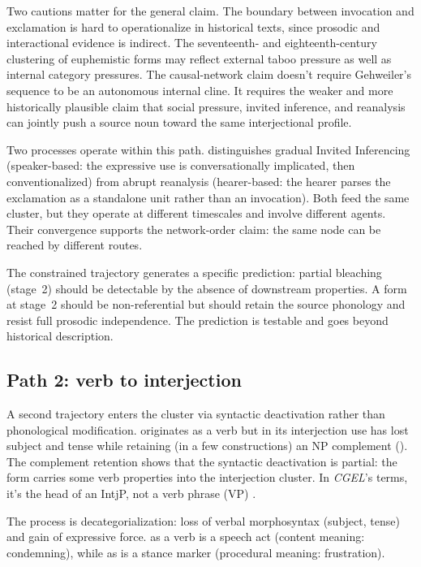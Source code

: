 \documentclass[12pt]{article}
\begin{document}
Two cautions matter for the general claim. The boundary between
invocation and exclamation is hard to operationalize in historical
texts, since prosodic and interactional evidence is indirect. The
seventeenth- and eighteenth-century clustering of euphemistic forms
may reflect external taboo pressure as well as internal category
pressures. The causal-network claim doesn't require Gehweiler's sequence
to be an autonomous internal cline. It requires the weaker and more
historically plausible claim that social pressure, invited inference,
and reanalysis can jointly push a source noun toward the same
interjectional profile.

Two processes operate within this path.
\textcite[76]{gehweiler2008} distinguishes gradual Invited Inferencing
(speaker-based: the expressive use is conversationally implicated, then
conventionalized) from abrupt reanalysis (hearer-based: the hearer parses
the exclamation as a standalone unit rather than an invocation).
Both feed the same cluster, but they operate at different timescales and
involve different agents. Their convergence supports the network-order
claim: the same node can be reached by different routes.

The constrained trajectory generates a specific prediction: partial
bleaching (stage~2) should be detectable by the absence of
downstream properties. A form at stage~2 should be non-referential but
should retain the source phonology and resist full prosodic independence.
The prediction is testable and goes beyond historical description.

\subsection{Path 2: verb to interjection}

A second trajectory enters the cluster via syntactic deactivation rather
than phonological modification.  originates as a verb but
in its interjection use has lost subject and tense while retaining (in
a few constructions) an NP complement ().
The complement retention shows that the syntactic deactivation is
partial: the form carries some verb properties into the interjection
cluster. In \textit{CGEL}'s
terms, it's the head of an IntjP, not a verb phrase (VP)
\citep[1361fn]{HuddlestonPullum2002}.

The process is decategorialization: loss of verbal morphosyntax
(subject, tense) and gain of expressive force.
 as a verb is a speech act (content meaning: condemning),
while  as  is a stance
marker (procedural meaning: frustration).
\end{document}
